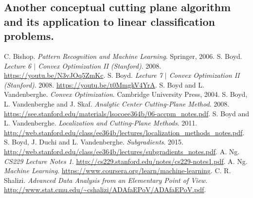 \documentclass[11pt]{amsart}
\theoremstyle{definition}
\theoremstyle{remark}
\begin{document}
    \subsection*{Another conceptual cutting plane algorithm and its application to linear classification problems.}

\renewcommand\refname{Bibliography}
\begin{thebibliography}{99}
     C. Bishop. \emph{Pattern Recognition and Machine Learning}. Springer, 2006.
    \bibitem[Boy08A] S. Boyd. \emph{Lecture 6 $|$ Convex Optimization II (Stanford)}. 2008. \url{https://youtu.be/N3vJOq5ZmKc}.
    \bibitem[Boy08B] S. Boyd. \emph{Lecture 7 $|$ Convex Optimization II (Stanford)}. 2008. \url{https://youtu.be/t0MmgkV4YrA}.
     S. Boyd and L. Vandenberghe. \emph{Convex Optimization}. Cambridge University Press, 2004.
     S. Boyd, L. Vandenberghe and J. Skaf. \emph{Analytic Center Cutting-Plane Method}. 2008. \url{https://see.stanford.edu/materials/lsocoee364b/06-accpm_notes.pdf}.
     S. Boyd and L. Vandenberghe. \emph{Localization and Cutting-Plane Methods}. 2011. \url{http://web.stanford.edu/class/ee364b/lectures/localization_methods_notes.pdf}.
     S. Boyd, J. Duchi and L. Vandenberghe. \emph{Subgradients}. 2015. \url{http://web.stanford.edu/class/ee364b/lectures/subgradients_notes.pdf}.
     A. Ng. \emph{CS229 Lecture Notes 1}. \url{http://cs229.stanford.edu/notes/cs229-notes1.pdf}.
     A. Ng. \emph{Machine Learning}. \url{https://www.coursera.org/learn/machine-learning}.
     C. R. Shalizi. \emph{Advanced Data Analysis
    from an Elementary Point of View}. \url{http://www.stat.cmu.edu/~cshalizi/ADAfaEPoV/ADAfaEPoV.pdf}. 
\end{thebibliography}




\end{document}

